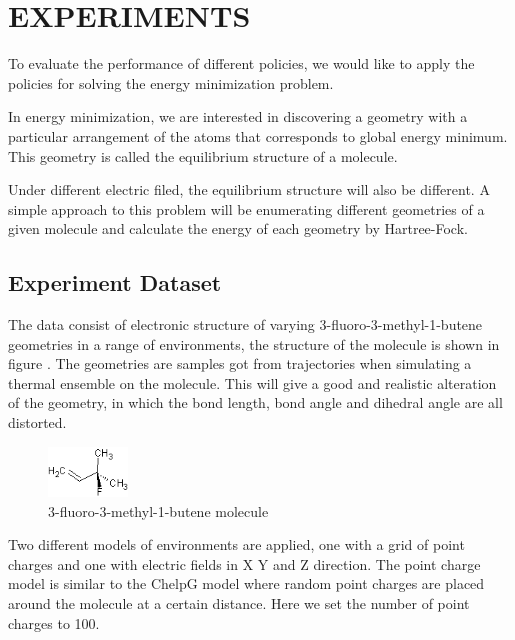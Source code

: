 \documentclass[twoside]{article}
\begin{document}
\section{EXPERIMENTS}

To evaluate the performance of different policies, we would like to apply the policies for solving the energy minimization problem.

In energy minimization, we are interested in discovering a geometry with a particular arrangement of the atoms that corresponds to global energy minimum. This geometry is called the equilibrium structure of a molecule.

Under different electric filed, the equilibrium structure will also be different. A simple approach to this problem will be enumerating different geometries of a given molecule and calculate the energy of each geometry by Hartree-Fock. 

 
\subsection{Experiment Dataset}

The data consist of electronic structure of varying 3-fluoro-3-methyl-1-butene geometries in a range of environments, the structure of the molecule is shown in figure \cite{fig:molecule}. The geometries are samples got from trajectories when simulating a thermal ensemble on the molecule. This will give a good and realistic alteration of the geometry, in which the bond length, bond angle and dihedral angle are all distorted. 

\begin{figure}[h!]

  \caption{3-fluoro-3-methyl-1-butene molecule}
  \label{fig:molecule}
    \centerline{\includegraphics[width=80px]{3-fluoro-3-methyl-1-butene.png}}
\end{figure}


Two different models of environments are applied, one with a grid of point charges and one with electric fields in X Y and Z direction. The point charge model is similar to the ChelpG model\cite{ChelpG} where random point charges are placed around the molecule at a certain distance. Here we set the number of point charges to 100.
 
\end{document}

